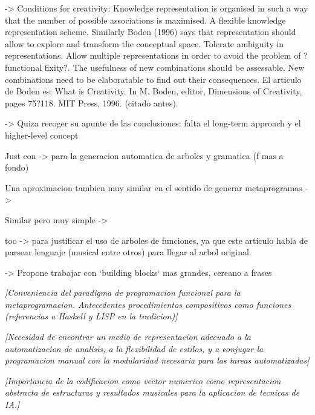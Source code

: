 \documentclass{article}
\begin{document}
{\color{red}


\cite{DBLP:journals/air/RoweP93} -> Conditions for creativity:
Knowledge representation is organised in such a
way that the number of possible associations is
maximised. A flexible knowledge representation
scheme. Similarly Boden (1996) says that representation
should allow to explore and transform the
conceptual space.
Tolerate ambiguity in representations.
Allow multiple representations in order to avoid the
problem of ?functional fixity?.
The usefulness of new combinations should be assessable.
New combinations need to be elaboratable to find
out their consequences.
El articulo de Boden es: 
What is Creativity. In M. Boden, editor, Dimensions of Creativity, pages 75?118. MIT Press, 1996. (citado antes).

\cite{Herremans:2017:FTM:3145473.3108242} -> Quiza recoger su apunte de las conclusiones: falta el long-term approach y el higher-level concept 




Just con \cite{Drewes_analgebra} -> para la generacion automatica de arboles y gramatica (f mas a fondo)

Una aproximacion tambien muy similar en el sentido de generar metaprogramas -> \cite{Spector_inductionand}

Similar pero muy simple -> \cite{Ando}

too \cite{Bod_thedata-oriented} -> para justificar el uso de arboles de funciones, ya que este articulo habla de parsear lenguaje (musical entre otros) para llegar al arbol original.

}



 
{\color{red}

\cite{DBLP:conf/icmc/Jacob95} -> Propone trabajar con `building blocks` mas grandes, cercano a frases
}


{\color{gray} \textsl{[Conveniencia del paradigma de programacion funcional para la metaprogramacion. Antecedentes procedimientos compositivos como funciones (referencias a Haskell y LISP en la tradicion)]}}

{\color{gray} \textsl{[Necesidad de encontrar un medio de representacion adecuado a la automatizacion de analisis, a la flexibilidad de estilos, y a conjugar la programacion manual con la modularidad necesaria para las tareas automatizadas]}}

{\color{gray} \textsl{[Importancia de la codificacion como vector numerico como representacion abstracta de estructuras y resultados musicales para la aplicacion de tecnicas de IA.]}}
\end{document}
